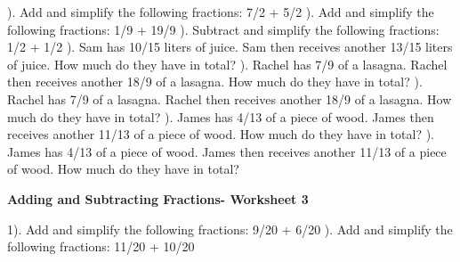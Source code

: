 \documentclass{article}%
\begin{document}
). Add and simplify the following fractions: 7/2 + 5/2%
\newline%
\newline%
). Add and simplify the following fractions: 1/9 + 19/9%
\newline%
\newline%
). Subtract and simplify the following fractions: 1/2 + 1/2%
\newline%
\newline%
). Sam has 10/15 liters of juice. Sam then receives another 13/15 liters of juice. How much do they have in total?%
\newline%
\newline%
). Rachel has 7/9 of a lasagna. Rachel then receives another 18/9 of a lasagna. How much do they have in total?%
\newline%
\newline%
). Rachel has 7/9 of a lasagna. Rachel then receives another 18/9 of a lasagna. How much do they have in total?%
\newline%
\newline%
). James has 4/13 of a piece of wood. James then receives another 11/13 of a piece of wood. How much do they have in total?%
\newline%
\newline%
). James has 4/13 of a piece of wood. James then receives another 11/13 of a piece of wood. How much do they have in total?%
\newline%
\newline%
\newline%
\pagebreak%
\large%
\begin{center}%
\textbf{Adding and Subtracting Fractions- Worksheet 3}%
\newline%
\end{center} \normalsize%
1). Add and simplify the following fractions: 9/20 + 6/20%
\newline%
\newline%
). Add and simplify the following fractions: 11/20 + 10/20%
\newline%
\end{document}
